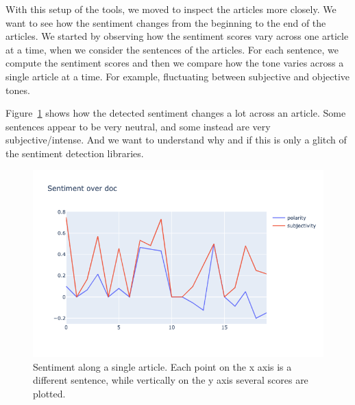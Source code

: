 
With this setup of the tools, we moved to inspect the articles more closely. We want to see how the sentiment changes from the beginning to the end of the articles. %
We started by observing how the sentiment scores vary across one article at a time, when we consider the sentences of the articles.
For each sentence, we compute the sentiment scores and then we compare how the tone varies across a single article at a time.
For example, fluctuating between subjective and objective tones.

Figure~\ref{fig:sentiment_across_one_article} shows how the detected sentiment changes a lot across an article.
Some sentences appear to be very neutral, and some instead are very subjective/intense. And we want to understand why and if this is only a glitch of the sentiment detection libraries.

\begin{figure}[!htbp]
    \centering
    \includegraphics[width=\linewidth]{figures/sentiment_across_article.png}
    \caption{Sentiment along a single article. Each point on the x axis is a different sentence, while vertically on the y axis several scores are plotted.}
    \label{fig:sentiment_across_one_article}
\end{figure}

